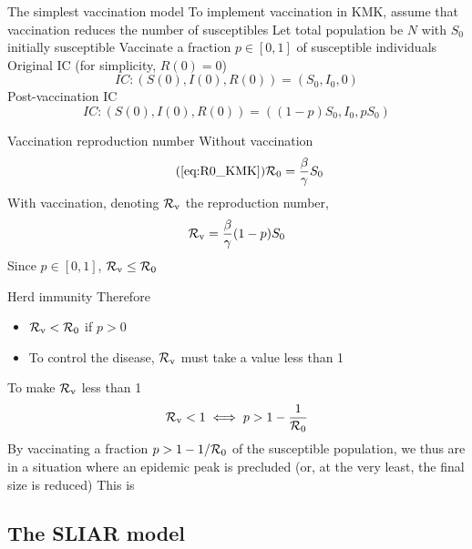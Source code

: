 \documentclass[aspectratio=169]{beamer}\usepackage[]{graphicx}\usepackage[]{xcolor}
\begin{document}
\begin{frame}{The simplest vaccination model}
To implement vaccination in KMK, assume that vaccination reduces the number of susceptibles
\vfill
Let total population be $N$ with $S_0$ initially susceptible
\vfill
Vaccinate a fraction $p\in[0,1]$ of susceptible individuals
\vfill
Original IC (for simplicity, $R(0)=0$)
\begin{equation}\label{eq:IC_KMK_novacc}
IC: (S(0),I(0),R(0)) = (S_0,I_0,0)
\end{equation}
Post-vaccination IC 
\begin{equation}\label{eq:IC_KMK_vacc}
IC: (S(0),I(0),R(0)) = ((1-p)S_0,I_0,pS_0)
\end{equation}
\end{frame}


\begin{frame}{Vaccination reproduction number}
  Without vaccination
  \begin{equation}\tag{\ref{eq:R0_KMK}}
    \R_0=\frac{\beta}{\gamma}S_0
  \end{equation}
  \vfill
  With vaccination, denoting $\mathcal{R}_{\text{v}}$ the reproduction number,
  \begin{equation}
    \mathcal{R}_{\text{v}} = \frac{\beta}{\gamma}(1-p)S_0
  \end{equation}
  \vfill
  Since $p\in[0,1]$, $\mathcal{R}_{\text{v}}\leq\mathcal{R}_0$
\end{frame}


\begin{frame}{Herd immunity}
  Therefore
  \begin{itemize}
    \item $\mathcal{R}_{\text{v}}<\mathcal{R}_0$ if $p>0$ 
    \item To control the disease, $\mathcal{R}_{\text{v}}$ must take a value less than 1
  \end{itemize}
  \vfill
To make $\mathcal{R}_{\text{v}}$ less than 1
  \begin{equation}\label{eq:herd_immunity}
    \mathcal{R}_{\text{v}}<1 \iff p> 1-\frac{1}{\mathcal{R}_0}
  \end{equation}
  \vfill
  By vaccinating a fraction $p>1-1/\mathcal{R}_0$ of the susceptible population, we thus are in a situation where an epidemic peak is precluded (or, at the very least, the final size is reduced)
  \vfill
  This is 
\end{frame}


\subsection{The SLIAR model}
\end{document}
